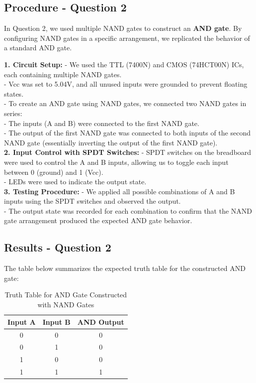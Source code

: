 \documentclass{article}
\begin{document}
   \subsection*{\textbf{Procedure - Question 2}}
   In Question 2, we used multiple NAND gates to construct an \textbf{AND gate}. By configuring NAND gates in a specific arrangement, we replicated the behavior of a standard AND gate.

   \textbf{1. Circuit Setup:}
      - We used the TTL (7400N) and CMOS (74HCT00N) ICs, each containing multiple NAND gates.
      \\
      - Vcc was set to 5.04V, and all unused inputs were grounded to prevent floating states.
      \\
      - To create an AND gate using NAND gates, we connected two NAND gates in series:
      \\
        - The inputs (A and B) were connected to the first NAND gate.
        \\
        - The output of the first NAND gate was connected to both inputs of the second NAND gate (essentially inverting the output of the first NAND gate).
        \\
   
   \textbf{2. Input Control with SPDT Switches:}
      - SPDT switches on the breadboard were used to control the A and B inputs, allowing us to toggle each input between 0 (ground) and 1 (Vcc).
      \\
      - LEDs were used to indicate the output state.
      \\
   
   \textbf{3. Testing Procedure:}
      - We applied all possible combinations of A and B inputs using the SPDT switches and observed the output.
      \\
      - The output state was recorded for each combination to confirm that the NAND gate arrangement produced the expected AND gate behavior.
      \\
   
   \subsection*{\textbf{Results - Question 2}}
   The table below summarizes the expected truth table for the constructed AND gate:
   
   \begin{table}[H]
       \centering
       \caption{Truth Table for AND Gate Constructed with NAND Gates}
       \begin{tabular}{|c|c|c|}
           \hline
           Input A & Input B & AND Output \\
           \hline
           0 & 0 & 0 \\
           0 & 1 & 0 \\
           1 & 0 & 0 \\
           1 & 1 & 1 \\
           \hline
       \end{tabular}
   \end{table}
\end{document}
